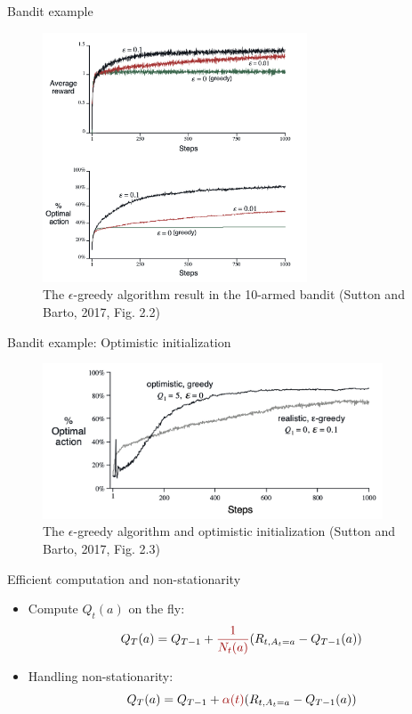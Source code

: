 \documentclass[10pt]{beamer}
\begin{document}
\begin{frame}{Bandit example}

\begin{figure}[h]
\centering
\includegraphics[width=0.7\textwidth]{fig/sutton_fig_2_2.png}
\caption{The $\epsilon$-greedy algorithm result in the 10-armed bandit (Sutton and Barto, 2017, Fig. 2.2)}
\end{figure}

\end{frame}


\begin{frame}{Bandit example: Optimistic initialization}

\begin{figure}[h]
\centering
\includegraphics[width=0.9\textwidth]{fig/sutton_fig_2_3.png}
\caption{The $\epsilon$-greedy algorithm and optimistic initialization (Sutton and Barto, 2017, Fig. 2.3)}
\end{figure}

\end{frame}



\begin{frame}{Efficient computation and non-stationarity}

\begin{itemize}
\item Compute $Q_t(a)$ on the fly:
\[
Q_T(a) = Q_{T-1} + {\color{uured} \frac{1}{N_t(a)}} (R_{t,A_t=a} - Q_{T-1}(a))
\]
\pause
\item Handling non-stationarity:
\[
Q_T(a) = Q_{T-1} + {\color{uured} \alpha(t)} (R_{t, A_t=a} - Q_{T-1}(a))
\]
\end{itemize}

\end{frame}
\end{document}

